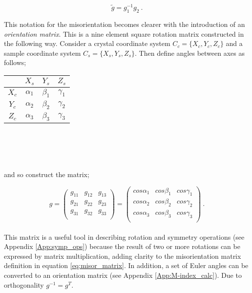\documentclass[a4paper,12pt,twoside]{report}
\numberwithin{equation}{chapter}
\begin{document}
\begin{equation} \label{eq:misor_matrix}
\tilde{g} = g_1^{-1}g_2\ .
\end{equation} 

This notation for the misorientation becomes clearer with the introduction of an \emph{orientation matrix}. This is a nine element square rotation matrix constructed in the following way. Consider a crystal coordinate system $C_c = \{X_c,Y_c,Z_c\}$ and a sample coordinate system $C_s = \{X_s,Y_s,Z_s\}$. Then define angles between axes as follows;
\begin{table}[t!]
    \centering
	\begin{tabular}{c | c c c}

	  & $X_s$      & $Y_s$      & $Z_s$ \\
\hline
$X_c$ & $\alpha_1$ & $\beta_1$ & $\gamma_1$ \\
$Y_c$ & $\alpha_2$ & $\beta_2$ & $\gamma_2$ \\
$Z_c$ & $\alpha_3$ & $\beta_3$ & $\gamma_3$ \\

	\end{tabular}
\end{table}
\\
\\
\\
\\
\noindent
and so construct the matrix;

\begin{equation}
g = 
\begin{pmatrix}
g_{11} & g_{12} & g_{13} \\
g_{21} & g_{22} & g_{23} \\
g_{31} & g_{32} & g_{33} \\
\end{pmatrix}
= 
\begin{pmatrix}
cos \alpha_1 & cos \beta_1 & cos \gamma_1 \\
cos \alpha_2 & cos \beta_2 & cos \gamma_2 \\
cos \alpha_3 & cos \beta_3 & cos \gamma_3 \\
\end{pmatrix}\ .
\end{equation}
\\
This matrix is a useful tool in describing rotation and symmetry operations (see Appendix \ref{App:symp_ops}) because the result of two or more rotations can be expressed by matrix multiplication, adding clarity to the misorientation matrix definition in equation \ref{eq:misor_matrix}. In addition, a set of Euler angles can be converted to an orientation matrix (see Appendix \ref{App:M-index_calc}). Due to orthogonality $g^{-1} = g^T$. 
\end{document}
